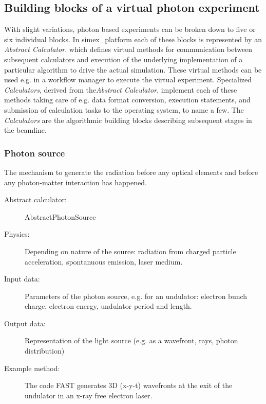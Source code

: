 \documentclass[a4paper]{article}
\begin{document}
\subsection{Building blocks of a virtual photon experiment}
With slight variations, photon based experiments can be broken down to five or six individual blocks. In simex\_platform each of these blocks is
represented by an \textit{Abstract Calculator}. which defines virtual methods for communication between subsequent calculators and execution of
the underlying implementation of a particular algorithm to drive the actual simulation. These virtual methods can be used e.g. in a workflow manager to execute the virtual experiment.
Specialized \textit{Calculators}, derived from the\textit{Abstract Calculator}, implement each of these methods taking care of e.g. data
format conversion, execution statements, and submission of calculation tasks to the operating system, to name a few. The
\textit{Calculators} are the algorithmic building blocks describing subsequent stages in the beamline.

\subsubsection{Photon source}
The mechanism to generate the radiation before any optical elements and before any photon-matter interaction has happened.
\begin{description}
  \item[Abstract calculator:] AbstractPhotonSource
  \item[Physics:] Depending on nature of the source: radiation from charged particle acceleration, spontanuous emission, laser medium.
  \item[Input data:] Parameters of the photon source, e.g. for an undulator: electron bunch charge, electron energy, undulator period and length.
  \item[Output data:] Representation of the light source (e.g. as a wavefront, rays, photon distribution)
  \item[Example method:] The code FAST generates 3D (x-y-t) wavefronts at the exit of the undulator in an x-ray free electron laser.
\end{description}
\end{document}
